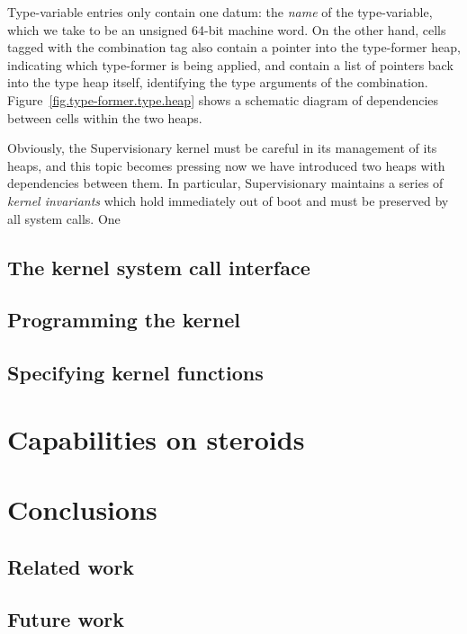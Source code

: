 \documentclass[a4paper, UKenglish, cleveref, autoref, thm-restate]{lipics-v2021}
\begin{document}
Type-variable entries only contain one datum: the \emph{name} of the type-variable, which we take to be an unsigned 64-bit machine word.
On the other hand, cells tagged with the combination tag also contain a pointer into the type-former heap, indicating which type-former is being applied, and contain a list of pointers back into the type heap itself, identifying the type arguments of the combination.
Figure~\ref{fig.type-former.type.heap} shows a schematic diagram of dependencies between cells within the two heaps.

Obviously, the Supervisionary kernel must be careful in its management of its heaps, and this topic becomes pressing now we have introduced two heaps with dependencies between them.
In particular, Supervisionary maintains a series of \emph{kernel invariants} which hold immediately out of boot and must be preserved by all system calls.
One 

\subsection{The kernel system call interface}

\subsection{Programming the kernel}

\subsection{Specifying kernel functions}

\section{Capabilities on steroids}
\label{sect.capabilities.on.steroids}

\section{Conclusions}
\label{sect.conclusions}

\subsection{Related work}

\subsection{Future work}
\end{document}
